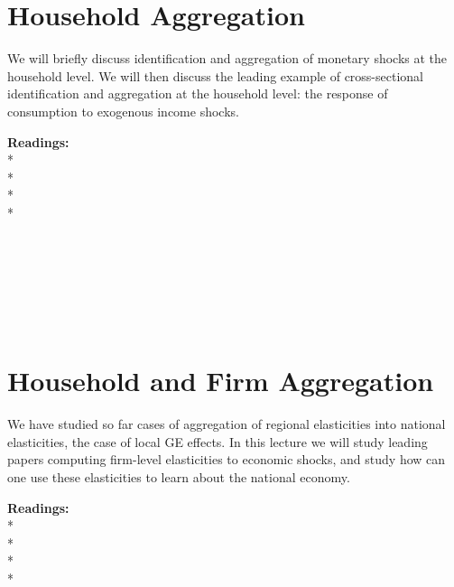 \documentclass [12pt]{article}
\begin{document}
\section{Household Aggregation}

We will briefly discuss identification and aggregation of monetary shocks at the household level. We will then discuss the leading example of cross-sectional identification and aggregation at the household level: the response of consumption to exogenous income shocks.

\noindent\textbf{Readings:}\\
*\\
*\\
*\\
* \\
\\
 \\
 \\
 \\
\\
\\

\section{Household and Firm Aggregation}


We have studied so far cases of aggregation of regional elasticities into national elasticities, the case of local GE effects. In this lecture we will study leading papers computing firm-level elasticities to economic shocks, and study how can one use these elasticities to learn about the national economy. 

\noindent\textbf{Readings:}\\
*\\
*\\
*\\
*\\
\\
\\
\end{document}
